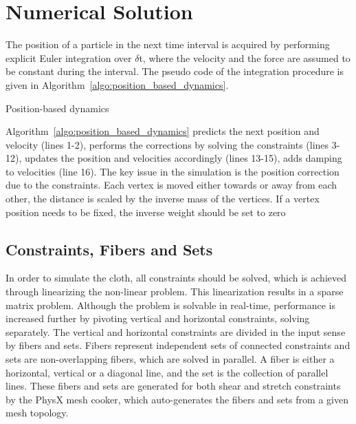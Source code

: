 \section{Numerical Solution}
\label{section_numerical_solution}
The position of a particle in the next time interval is acquired by performing explicit Euler integration over $\delta$t, where the velocity and the force are assumed to be constant during the interval. The pseudo code of the integration procedure is given in Algorithm~\ref{algo:position_based_dynamics}.

\begin{algorithm}[ht]
\DontPrintSemicolon %
\caption{Position-based dynamics}
\label{algo:position_based_dynamics}
\end{algorithm}

Algorithm~\ref{algo:position_based_dynamics} predicts the next position and velocity (lines 1-2), performs the corrections by solving the constraints (lines 3-12), updates the position and velocities accordingly (lines 13-15), adds damping to velocities (line 16). The key issue in the simulation is the position correction due to the constraints. Each vertex is moved either towards or away from each other, the distance is scaled by the inverse mass of the vertices. If a vertex position needs to be fixed, the inverse weight should be set to zero

\subsection{Constraints, Fibers and Sets}
In order to simulate the cloth, all constraints should be solved, which is achieved through linearizing the non-linear problem. This linearization results in a sparse matrix problem. Although the problem is solvable in real-time, performance is increased further by pivoting vertical and horizontal constraints, solving separately. The vertical and horizontal constraints are divided in the input sense by fibers and sets. Fibers represent independent sets of connected constraints and sets are non-overlapping fibers, which are solved in parallel. A fiber is either a horizontal, vertical or a diagonal line, and the set is the collection of parallel lines. These fibers and sets are generated for both shear and stretch constraints by the PhysX mesh cooker, which auto-generates the fibers and sets from a given mesh topology. 

